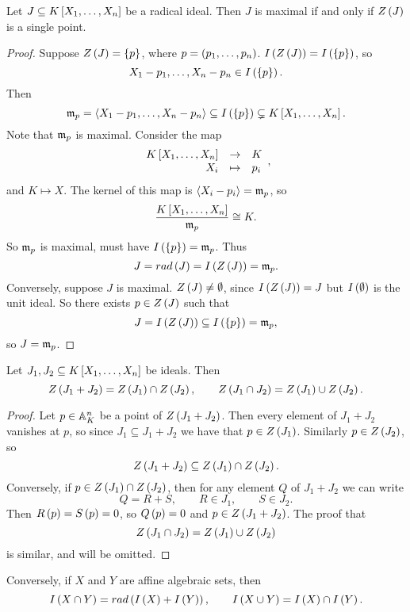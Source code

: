 \begin{proposition}
Let $ J \subseteq K\sb{X_1, \dots, X_n} $ be a radical ideal. Then $ J $ is maximal if and only if $ Z\rb{J} $ is a single point.
\end{proposition}

\begin{proof}
Suppose $ Z\rb{J} = \cb{p} $, where $ p = \rb{p_1, \dots, p_n} $. $ I\rb{Z\rb{J}} = I\rb{\cb{p}} $, so
$$ X_1 - p_1, \dots, X_n - p_n \in I\rb{\cb{p}}. $$
Then
$$ \mm_p = \ab{X_1 - p_1, \dots, X_n - p_n} \subseteq I\rb{\cb{p}} \subsetneq K\sb{X_1, \dots, X_n}. $$
Note that $ \mm_p $ is maximal. Consider the map
$$ \function{K\sb{X_1, \dots, X_n}}{K}{X_i}{p_i}, $$
and $ K \mapsto X $. The kernel of this map is $ \ab{X_i - p_i} = \mm_p $, so
$$ \dfrac{K\sb{X_1, \dots, X_n}}{\mm_p} \cong K. $$
So $ \mm_p $ is maximal, must have $ I\rb{\cb{p}} = \mm_p $. Thus
$$ J = rad\rb{J} = I\rb{Z\rb{J}} = \mm_p. $$
Conversely, suppose $ J $ is maximal. $ Z\rb{J} \ne \emptyset $, since $ I\rb{Z\rb{J}} = J $ but $ I\rb{\emptyset} $ is the unit ideal. So there exists $ p \in Z\rb{J} $ such that
$$ J = I\rb{Z\rb{J}} \subseteq I\rb{\cb{p}} = \mm_p, $$
so $ J = \mm_p $.
\end{proof}

\begin{proposition}
Let $ J_1, J_2 \subseteq K\sb{X_1, \dots, X_n} $ be ideals. Then
$$ Z\rb{J_1 + J_2} = Z\rb{J_1} \cap Z\rb{J_2}, \qquad Z\rb{J_1 \cap J_2} = Z\rb{J_1} \cup Z\rb{J_2}. $$
\end{proposition}

\begin{proof}
Let $ p \in \A_K^n $ be a point of $ Z\rb{J_1 + J_2} $. Then every element of $ J_1 + J_2 $ vanishes at $ p $, so since $ J_1 \subseteq J_1 + J_2 $ we have that $ p \in Z\rb{J_1} $. Similarly $ p \in Z\rb{J_2} $, so
$$ Z\rb{J_1 + J_2} \subseteq Z\rb{J_1} \cap Z\rb{J_2}. $$
Conversely, if $ p \in Z\rb{J_1} \cap Z\rb{J_2} $, then for any element $ Q $ of $ J_1 + J_2 $ we can write
$$ Q = R + S, \qquad R \in J_1, \qquad S \in J_2. $$
Then $ R\rb{p} = S\rb{p} = 0 $, so $ Q\rb{p} = 0 $ and $ p \in Z\rb{J_1 + J_2} $. The proof that
$$ Z\rb{J_1 \cap J_2} = Z\rb{J_1} \cup Z\rb{J_2} $$
is similar, and will be omitted.
\end{proof}

\begin{corollary}
Conversely, if $ X $ and $ Y $ are affine algebraic sets, then
$$ I\rb{X \cap Y} = rad\rb{I\rb{X} + I\rb{Y}}, \qquad I\rb{X \cup Y} = I\rb{X} \cap I\rb{Y}. $$
\end{corollary}

